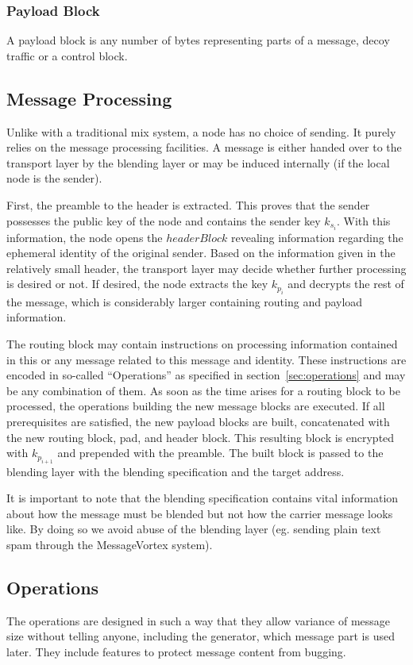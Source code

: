 \documentclass[9pt,journal,compsoc]{IEEEtran}
\begin{document}
\subsubsection{Payload Block}
A payload block is any number of bytes representing parts of a message, decoy traffic or a control block.

\subsection{Message Processing\label{sec:processing}}
Unlike with a traditional mix system, a node has no choice of sending. It purely relies on the message processing facilities. A message is either handed over to the transport layer by the blending layer or may be induced internally (if the local node is the sender). 

First, the preamble to the header is extracted. This proves that the sender possesses the public key of the node and contains the sender key $k_{s_i}$. With this information, the node opens the $headerBlock$ revealing information regarding the ephemeral identity of the original sender. Based on the information given in the relatively small header, the transport layer may decide whether further processing is desired or not. If desired, the node extracts the key $k_{p_i}$ and decrypts the rest of the message, which is considerably larger containing routing and payload information.

The routing block may contain instructions on processing information contained in this or any message related to this message and identity. These instructions are encoded in so-called ``Operations'' as specified in section~\ref{sec:operations} and may be any combination of them. As soon as the time arises for a routing block to be processed, the operations building the new message blocks are executed. If all prerequisites are satisfied, the new payload blocks are built, concatenated with the new routing block, pad, and header block. This resulting block is encrypted with $k_{p_{i+1}}$ and prepended with the preamble. The built block is passed to the blending layer with the blending specification and the target address.

It is important to note that the blending specification contains vital information about how the message must be blended but not how the carrier message looks like. By doing so we avoid abuse of the blending layer (eg. sending plain text spam through the MessageVortex system).

\subsection{Operations\label{sec:operations}}
The operations are designed in such a way that they allow  variance of message size without telling anyone, including the generator, which message part is used later. They include features to protect message content from bugging.
\end{document}
